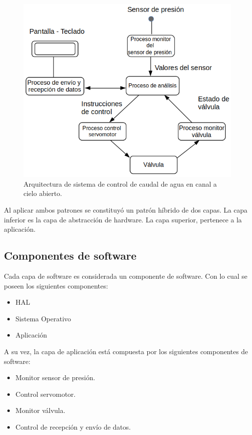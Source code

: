 \begin{figure}[htpb]
\centering
\includegraphics[scale=.65]{./Figures/ArquitecturaSoftware.png}
\caption{Arquitectura de sistema de control de caudal de agua en canal a cielo abierto.}
\label{fig:Arquitectura de software}
\end{figure}

Al aplicar ambos patrones se constituyó un patrón híbrido de dos capas. La capa inferior es la capa de abstracción de hardware. La capa superior, pertenece a la aplicación.

\vspace{2cm}

\subsection{Componentes de software}
\label{subsec:Componentes de software}
Cada capa de software es considerada un componente de software. Con lo cual se poseen los siguientes componentes:

\begin{itemize}
\item HAL
\item Sistema Operativo
\item Aplicación
\end{itemize}

A su vez, la capa de aplicación está compuesta por los siguientes componentes de software:

\begin{itemize}
\item Monitor sensor de presión.
\item Control servomotor.
\item Monitor válvula.
\item Control de recepción y envío de datos.
\end{itemize}

